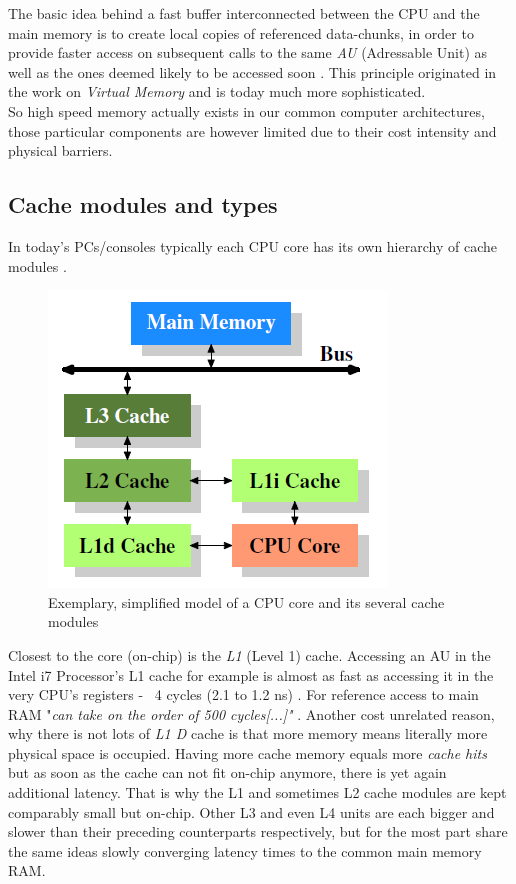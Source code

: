 The basic idea behind a fast buffer interconnected between the CPU and the main memory is to create local copies of referenced data-chunks, in order to provide faster access on subsequent calls to the same \textit{AU} (Adressable Unit) as well as the ones deemed likely to be accessed soon . This principle originated in the work on \textit{Virtual Memory}  and is today much more sophisticated.\\
So high speed memory actually exists in our common computer architectures, those particular components are however limited due to their cost intensity and physical barriers.

\subsection{Cache modules and types}
In today's PCs/consoles typically each CPU core has its own hierarchy of cache modules .
\begin{figure}[!htbp]
	\centering
	\includegraphics[width=0.4\linewidth]{PICs/cachelayout}
	\caption{Exemplary, simplified model of a CPU core and its several cache modules }\label{cache_layout}
\end{figure}
Closest to the core (on-chip) is the \textit{L1} (Level 1) cache. Accessing an AU in the  Intel i7 Processor's L1 cache for example is almost as fast as accessing it in the very CPU's registers - ~4 cycles (2.1 to 1.2 ns) . For reference access to main RAM "\textit{can take on the order of 500 cycles[...]"} .
Another cost unrelated reason, why there is not lots of \textit{L1 D} cache is that more memory means literally more physical space is occupied. Having more cache memory equals more \textit{cache hits}  but as soon as the cache can not fit on-chip anymore, there is yet again additional latency. That is why the L1 and sometimes L2 cache modules are kept comparably small but on-chip. Other L3 and even L4 units are each bigger and slower than their preceding counterparts respectively, but for the most part share the same ideas slowly converging latency times to the common main memory RAM.\\
